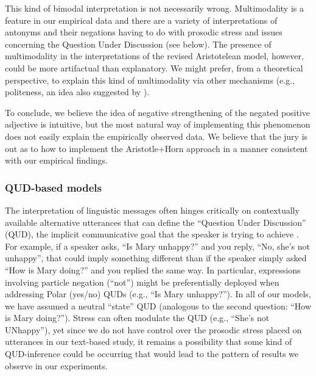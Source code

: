 \documentclass[floatsintext,doc]{apa6}
\begin{document}
This kind of bimodal interpretation is not necessarily wrong. Multimodality is a feature in our empirical data and there are a variety of interpretations of antonyms and their negations having to do with prosodic stress and issues concerning the Question Under Discussion (see below). 
The presence of multimodality in the interpretations of the revised Aristotelean model, however, could be more artifactual than explanatory. 
We might prefer, from a theoretical perspective, to explain this kind of multimodality via other mechanisms (e.g., politeness, an idea also suggested by ). 

To conclude, we believe the idea of negative strengthening of the negated positive adjective is intuitive, but the most natural way of implementing this phenomenon does not easily explain the empirically observed data. We believe that the jury is out as to how to implement the Aristotle+Horn approach in a manner consistent with our empirical findings. 


\subsubsection{QUD-based models}

The interpretation of linguistic messages often hinges critically on contextually available alternative utterances that can define the ``Question Under Discussion'' (QUD), the implicit communicative goal that the speaker is trying to achieve \cite{roberts2012information, beaver2017questions}. 
For example, if a speaker asks, ``Is Mary unhappy?'' and you reply, ``No, she's not unhappy'', that could imply something different than if the speaker simply asked ``How is Mary doing?'' and you replied the same way.
In particular, expressions involving particle negation (``not'') might be preferentially deployed when addressing Polar (yes/no) QUDs (e.g., ``Is Mary unhappy?'').
In all of  our models, we have assumed a neutral ``state'' QUD (analogous to the second question: ``How is Mary doing?''). 
Stress can often modulate the QUD (e.g., ``She's not UNhappy''), yet since we do not have control over the prosodic stress placed on utterances in our text-based study, it remains a possibility that some kind of QUD-inference could be occurring that would lead to the pattern of results we observe in our experiments. 
\end{document}
